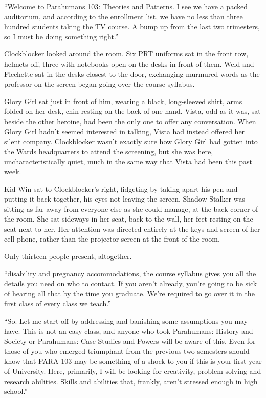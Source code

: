 





``Welcome to Parahumans 103: Theories and Patterns.  I see we have a packed auditorium, and according to the enrollment list, we have no less than three hundred students taking the TV course.  A bump up from the last two trimesters, so I must be doing something right.''



Clockblocker looked around the room.  Six PRT uniforms sat in the front row, helmets off, three with notebooks open on the desks in front of them.  Weld and Flechette sat in the desks closest to the door, exchanging murmured words as the professor on the screen began going over the course syllabus.



Glory Girl sat just in front of him, wearing a black, long-sleeved shirt, arms folded on her desk, chin resting on the back of one hand.  Vista, odd as it was, sat beside the other heroine, had been the only one to offer any conversation.  When Glory Girl hadn't seemed interested in talking, Vista had instead offered her silent company.  Clockblocker wasn't exactly sure how Glory Girl had gotten into the Wards headquarters to attend the screening, but she was here, uncharacteristically quiet, much in the same way that Vista had been this past week.



Kid Win sat to Clockblocker's right, fidgeting by taking apart his pen and putting it back together, his eyes not leaving the screen.  Shadow Stalker was sitting as far away from everyone else as she could manage, at the back corner of the room.  She sat sideways in her seat, back to the wall, her feet resting on the seat next to her.  Her attention was directed entirely at the keys and screen of her cell phone, rather than the projector screen at the front of the room.



Only thirteen people present, altogether.



``\ldotsfor disability and pregnancy accommodations, the course syllabus gives you all the details you need on who to contact.  If you aren't already, you're going to be sick of hearing all that by the time you graduate.  We're required to go over it in the first class of every class we teach.''



``So.  Let me start off by addressing and banishing some assumptions you may have.  This is not an easy class, and anyone who took Parahumans: History and Society or Parahumans: Case Studies and Powers will be aware of this.  Even for those of you who emerged triumphant from the previous two semesters should know that PARA-103 may be something of a shock to you if this is your first year of University.  Here, primarily, I will be looking for creativity, problem solving and research abilities.  Skills and abilities that, frankly, aren't stressed enough in high school.''



